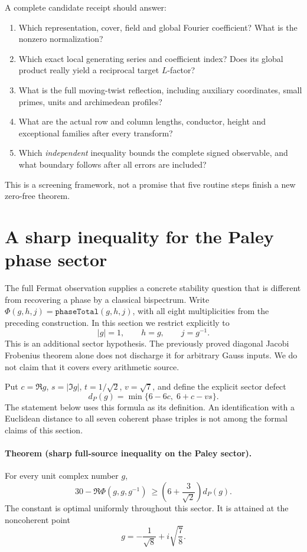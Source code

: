 \documentclass[11pt]{article}
\begin{document}
A complete candidate receipt should answer:
\begin{enumerate}
\item Which representation, cover, field and global Fourier coefficient?
What is the nonzero normalization?
\item Which exact local generating series and coefficient index?
Does its global product really yield a reciprocal target $L$-factor?
\item What is the full moving-twist reflection, including auxiliary
coordinates, small primes, units and archimedean profiles?
\item What are the actual row and column lengths, conductor, height and
exceptional families after every transform?
\item Which \emph{independent} inequality bounds the complete signed
observable, and what boundary follows after all errors are included?
\end{enumerate}
This is a screening framework, not a promise that five routine steps
finish a new zero-free theorem.

\section{A sharp inequality for the Paley phase sector}

The full Fermat observation supplies a concrete stability question that
is different from recovering a phase by a classical bispectrum.
Write \(\Phi(g,h,j)=\texttt{phaseTotal}(g,h,j)\), with all eight
multiplicities from the preceding construction. In this section we
restrict explicitly to
\[
 |g|=1,\qquad h=g,\qquad j=g^{-1}.
\]
This is an additional sector hypothesis. The previously proved diagonal
Jacobi Frobenius theorem alone does not discharge it for arbitrary Gauss
inputs. We do not claim that it covers every arithmetic source.

Put \(c=\Re g\), \(s=|\Im g|\), \(t=1/\sqrt2\), \(v=\sqrt7\), and define
the explicit sector defect
\[
 d_P(g)=\min\{6-6c,\;6+c-vs\}.
\]
The statement below uses this formula as its definition. An identification
with a Euclidean distance to all seven coherent phase triples is not
among the formal claims of this section.

\paragraph{Theorem (sharp full-source inequality on the Paley sector).}
For every unit complex number \(g\),
\[
 30-\Re\Phi(g,g,g^{-1})
 \ \ge\left(6+\frac3{\sqrt2}\right)d_P(g).
\]
The constant is optimal uniformly throughout this sector. It is attained
at the noncoherent point
\[
 g=-\frac1{\sqrt8}+i\sqrt{\frac78}.
\]
\end{document}
